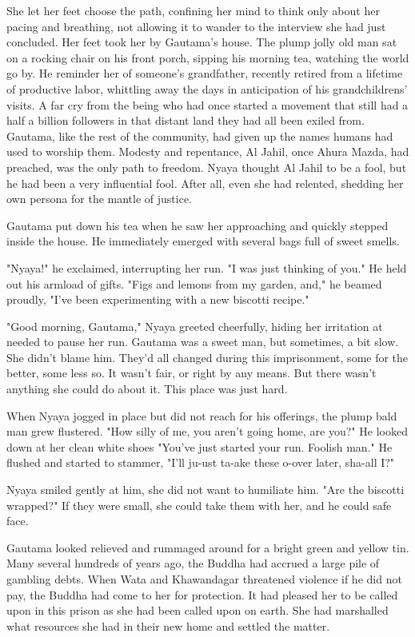 \documentclass{amsart}
\begin{document}
She let her feet choose the path, confining her mind to think only about her pacing and breathing, not allowing it to wander to the interview she had just concluded. Her feet took her by Gautama's house. The plump jolly old man sat on a rocking chair on his front porch, sipping his morning tea, watching the world go by. He reminder her of someone's grandfather, recently retired from a lifetime of productive labor, whittling away the days in anticipation of his grandchildrens' visits. A far cry from the being who had once started a movement that still had a half a billion followers in that distant land they had all been exiled from. Gautama, like the rest of the community, had given up the names humans had used to worship them. Modesty and repentance, Al Jahil, once Ahura Mazda, had preached, was the only path to freedom. Nyaya thought Al Jahil to be a fool, but he had been a very influential fool. After all, even she had relented, shedding her own persona for the mantle of justice. 

Gautama put down his tea when he saw her approaching and quickly stepped inside the house. He immediately emerged with several bags full of sweet smells. 

"Nyaya!" he exclaimed, interrupting her run. "I was just thinking of you." He held out his armload of gifts. "Figs and lemons from my garden, and," he beamed proudly, "I've been experimenting with a new biscotti recipe."

"Good morning, Gautama," Nyaya greeted cheerfully, hiding her irritation at needed to pause her run. Gautama was a sweet man, but sometimes, a bit slow. She didn't blame him. They'd all changed during this imprisonment, some for the better, some less so. It wasn't fair, or right by any means. But there wasn't anything she could do about it. This place was just hard.

When Nyaya jogged in place but did not reach for his offerings, the plump bald man grew flustered. "How silly of me, you aren't going home, are you?" He looked down at her clean white shoes "You've just started your run. Foolish man." He flushed and started to stammer, "I'll ju-ust ta-ake these o-over later, sha-all I?"

Nyaya smiled gently at him, she did not want to humiliate him. "Are the biscotti wrapped?" If they were small, she could take them with her, and he could safe face.

Gautama looked relieved and rummaged around for a bright green and yellow tin. Many several hundreds of years ago, the Buddha had accrued a large pile of gambling debts. When Wata and Khawandagar threatened violence if he did not pay, the Buddha had come to her for protection. It had pleased her to be called upon in this prison as she had been called upon on earth.  She had marshalled what resources she had in their new home and settled the matter. 
\end{document}
